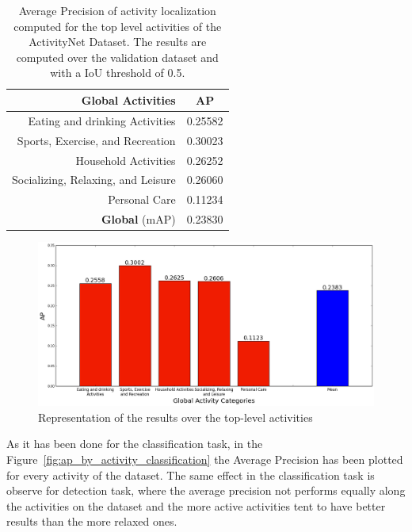 \begin{table}[H]
\begin{center}
\begin{tabular}{|r|c|}
\hline
\textbf{Global Activities} & \textbf{AP} \\
\hline\hline
Eating and drinking Activities & 0.25582 \\
Sports, Exercise, and Recreation & 0.30023 \\
Household Activities & 0.26252 \\
Socializing, Relaxing, and Leisure & 0.26060 \\
Personal Care & 0.11234 \\
\hline\hline
\textbf{Global} (mAP) & 0.23830 \\
\hline
\end{tabular}
\end{center}
\caption{Average Precision of activity localization computed for the top level activities of the ActivityNet Dataset. The results are computed over the validation dataset and with a IoU threshold of 0.5.}
\label{table:top_level_detection_ap}
\end{table}

\begin{figure}[H]
\begin{center}
\includegraphics[width=1\linewidth]{img/results/top_activities_detection_ap}
\end{center}
\caption{Representation of the results over the top-level activities}
\label{fig:top_level_detection_ap}
\end{figure}

As it has been done for the classification task, in the Figure~\ref{fig:ap_by_activity_classification} the Average Precision has been plotted for every activity of the dataset. The same effect in the classification task is observe for detection task, where the average precision not performs equally along the activities on the dataset and the more active activities tent to have better results than the more relaxed ones.

